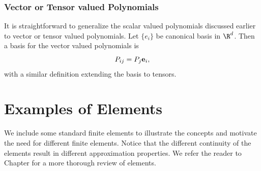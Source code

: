 \subsubsection{Vector or Tensor valued Polynomials}
It is straightforward to generalize the scalar valued polynomials discussed
earlier to vector or tensor valued polynomials. Let $\{e_i\}$ be canonical
basis in $\R^d$. Then a basis for the vector valued polynomials is
\[
P_{ij} = P_j \mathbf{e}_i,
\]
with a similar definition extending the basis to tensors.


\section{Examples of Elements}

We include some standard finite elements to illustrate the concepts and
motivate the need for different finite elements. Notice
that the different continuity of the elements result in
different approximation properties. 
We refer the reader to Chapter \cite{} for a more thorough review of 
elements.   

